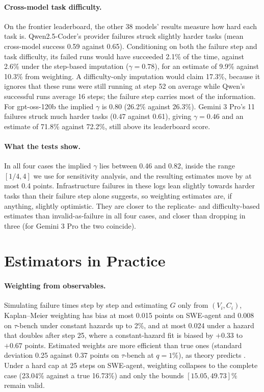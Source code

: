 \documentclass[11pt]{article}
\theoremstyle{definition}
\theoremstyle{remark}
\begin{document}
\paragraph{Cross-model task difficulty.} On the frontier leaderboard, the other
38 models' results measure how hard each task is. Qwen2.5-Coder's provider
failures struck slightly harder tasks (mean cross-model success 0.59 against
0.65). Conditioning on both the failure step and task difficulty, its failed runs
would have succeeded 2.1\% of the time, against 2.6\% under the step-based
imputation ($\gamma=0.78$), for an estimate of 9.9\% against 10.3\% from
weighting. A difficulty-only imputation would claim 17.3\%, because it ignores
that these runs were still running at step 52 on average while Qwen's successful
runs average 16 steps; the failure step carries most of the information. For
gpt-oss-120b the implied $\gamma$ is 0.80 (26.2\% against 26.3\%). Gemini 3 Pro's
11 failures struck much harder tasks (0.47 against 0.61), giving $\gamma=0.46$
and an estimate of 71.8\% against 72.2\%, still above its leaderboard score.

\paragraph{What the tests show.} In all four cases the implied $\gamma$ lies
between 0.46 and 0.82, inside the range $[1/4,4]$ we use for sensitivity
analysis, and the resulting estimates move by at most 0.4 points. Infrastructure
failures in these logs lean slightly towards harder tasks than their failure
step alone suggests, so weighting estimates are, if anything, slightly
optimistic. They are closer to the replicate- and difficulty-based estimates
than invalid-as-failure in all four cases, and closer than dropping in three
(for Gemini 3 Pro the two coincide).

\section{Estimators in Practice}
\label{sec:estimators}

\paragraph{Weighting from observables.} Simulating failure times step by step
and estimating $G$ only from $(V_i,C_i)$, Kaplan--Meier weighting has bias at
most 0.015 points on SWE-agent and 0.008 on $\tau$-bench under constant hazards
up to 2\%, and at most 0.024 under a hazard that doubles after step 25, where a
constant-hazard fit is biased by $+0.33$ to $+0.67$ points. Estimated weights are
more efficient than true ones (standard deviation 0.25 against 0.37 points on
$\tau$-bench at $q=1\%$), as theory predicts \citep{robins1994estimation}.
Under a hard cap at 25 steps on SWE-agent, weighting collapses to the complete
case (23.04\% against a true 16.73\%) and only the bounds
$[15.05,49.73]\%$ remain valid.
\end{document}
